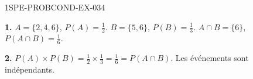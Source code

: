 \begin{corrige}{1SPE-PROBCOND-EX-034}

\textbf{1.} $A = \{2,4,6\}$, $P(A) = \frac{1}{2}$. $B = \{5,6\}$, $P(B) = \frac{1}{3}$. $A \cap B = \{6\}$, $P(A \cap B) = \frac{1}{6}$.

\textbf{2.} $P(A) \times P(B) = \frac{1}{2} \times \frac{1}{3} = \frac{1}{6} = P(A \cap B)$. Les événements sont indépendants.

\end{corrige}
